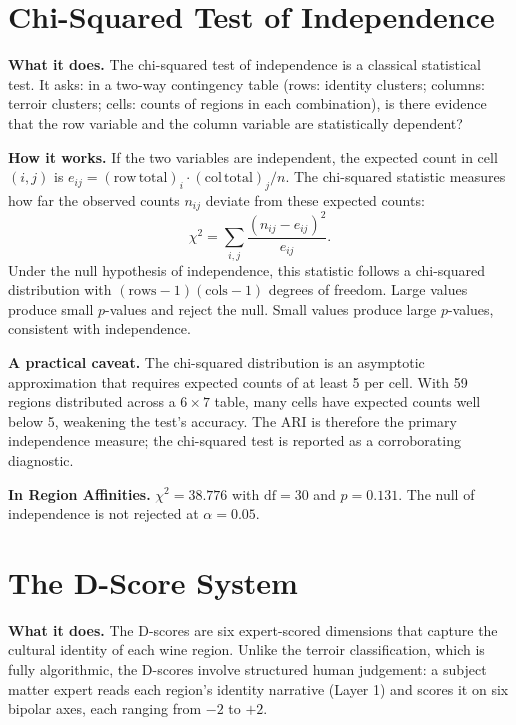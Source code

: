\documentclass[11pt]{article}
\begin{document}
\section{Chi-Squared Test of Independence}

\textbf{What it does.} The chi-squared test of independence is a classical statistical test. It asks: in a two-way contingency table (rows: identity clusters; columns: terroir clusters; cells: counts of regions in each combination), is there evidence that the row variable and the column variable are statistically dependent?

\textbf{How it works.} If the two variables are independent, the expected count in cell $(i, j)$ is $e_{ij} = \mathrm{(row\,total)}_i \cdot \mathrm{(col\,total)}_j / n$. The chi-squared statistic measures how far the observed counts $n_{ij}$ deviate from these expected counts:
\[
\chi^2 = \sum_{i, j} \frac{(n_{ij} - e_{ij})^2}{e_{ij}}.
\]
Under the null hypothesis of independence, this statistic follows a chi-squared distribution with $(\text{rows} - 1)(\text{cols} - 1)$ degrees of freedom. Large values produce small $p$-values and reject the null. Small values produce large $p$-values, consistent with independence.

\textbf{A practical caveat.} The chi-squared distribution is an asymptotic approximation that requires expected counts of at least 5 per cell. With 59 regions distributed across a $6 \times 7$ table, many cells have expected counts well below 5, weakening the test's accuracy. The ARI is therefore the primary independence measure; the chi-squared test is reported as a corroborating diagnostic.

\textbf{In Region Affinities.} $\chi^2 = 38.776$ with $\mathrm{df} = 30$ and $p = 0.131$. The null of independence is not rejected at $\alpha = 0.05$.

\section{The D-Score System}

\textbf{What it does.} The D-scores are six expert-scored dimensions that capture the cultural identity of each wine region. Unlike the terroir classification, which is fully algorithmic, the D-scores involve structured human judgement: a subject matter expert reads each region's identity narrative (Layer 1) and scores it on six bipolar axes, each ranging from $-2$ to $+2$.
\end{document}
